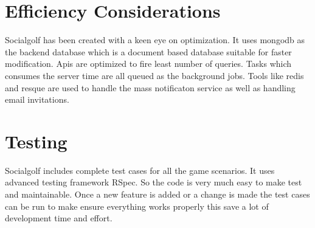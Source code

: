 \documentclass[12pt]{article}
\begin{document}
\section{Efficiency Considerations}
Socialgolf has been created with a keen eye on optimization. It uses mongodb as the backend database which is a document based database suitable for faster modification. Apis are optimized to fire least number of queries. Tasks which consumes the server time are all queued as the background jobs. Tools like redis and resque are used to handle the mass notificaton service as well as handling email invitations. 

\section{Testing}
Socialgolf includes complete test cases for all the game scenarios. It uses advanced testing framework RSpec. So the code is very much easy to make test and maintainable. Once a new feature is added or a change is made the test cases can be run to make ensure everything works properly this save a lot of development time and effort.
\end{document}
